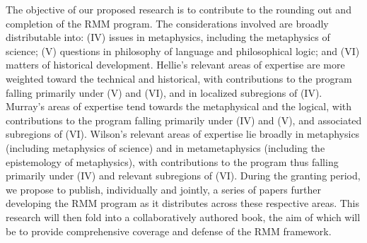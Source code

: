 \documentclass[12pt]{article}
\begin{document}
The objective of our proposed research is to contribute to the rounding out
and completion of the RMM program. The considerations involved are broadly
distributable into: (IV) issues in metaphysics, including the metaphysics of
science; (V) questions in philosophy of language and philosophical logic;
and (VI) matters of historical development. Hellie's
relevant areas of  expertise are more weighted toward the technical and
historical, with contributions to the program falling primarily under (V)
and (VI), and in localized subregions of (IV). Murray's areas of expertise
tend towards the metaphysical and the logical, with contributions to the
program falling primarily under (IV) and (V), and associated subregions of
(VI).  Wilson's relevant areas of expertise lie broadly in metaphysics
(including metaphysics of science) and in metametaphysics (including the
epistemology of metaphysics), with contributions to the program thus falling
primarily under (IV) and relevant subregions of (VI).  During the granting
period, we propose to publish, individually and jointly, a series of papers
further developing the RMM program as it distributes across these respective
areas.  This research will then fold into a collaboratively authored book, the
aim of which will be to provide comprehensive coverage and defense of the RMM
framework. 

\smallskip{}
\end{document}

